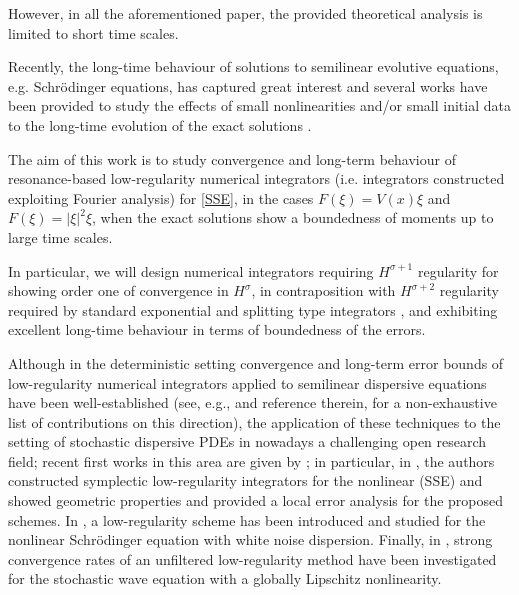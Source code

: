 \documentclass[a4paper]{amsart}
\begin{document}
However, in all the aforementioned paper, the provided theoretical analysis is limited to short time scales.

Recently, the long-time behaviour of solutions to semilinear evolutive equations, e.g. Schrödinger equations, has captured great interest and several works have been provided to study the effects of small nonlinearities and/or small initial data to the long-time evolution of the exact solutions \cite{bej,carl,fan,fuji,ik,oh,sun}.

The aim of this work is to study convergence and long-term behaviour of resonance-based low-regularity numerical integrators (i.e. integrators constructed exploiting Fourier analysis) for \eqref{SSE}, in the cases $F(\xi)=V(x)\xi$ and $F(\xi)=|\xi|^2 \xi$, when the exact solutions show a boundedness of moments up to large time scales.

In particular, we will design numerical integrators requiring $H^{\sigma+1}$ regularity for showing order one of convergence in $H^\sigma$, in contraposition with $H^{\sigma+2}$ regularity required by standard exponential and splitting type integrators \cite{bre-co}, and exhibiting excellent long-time behaviour in terms of boundedness of the errors.

Although in the deterministic setting convergence and long-term error bounds of low-regularity numerical integrators applied to semilinear dispersive equations have been well-established (see, e.g., \cite{bao,fe_ka,os_ka,ma_ka,fe_ma,ala,bru_ka,kat1,li,kat0} and reference therein, for a non-exhaustive list of contributions on this direction), the application of these techniques to the setting of stochastic dispersive PDEs in nowadays a challenging open research field; recent first works in this area are given by \cite{arm,cao,cui1}; in particular, in \cite{arm}, the authors constructed symplectic low-regularity integrators for the nonlinear (SSE) and showed geometric properties and provided a local error analysis for the proposed schemes. In \cite{cui1}, a low-regularity scheme has been introduced and studied for the nonlinear Schrödinger equation with white noise dispersion. Finally, in \cite{cao}, strong convergence rates of an unfiltered low-regularity method have been investigated for the stochastic wave equation with a globally Lipschitz nonlinearity.
\end{document}
